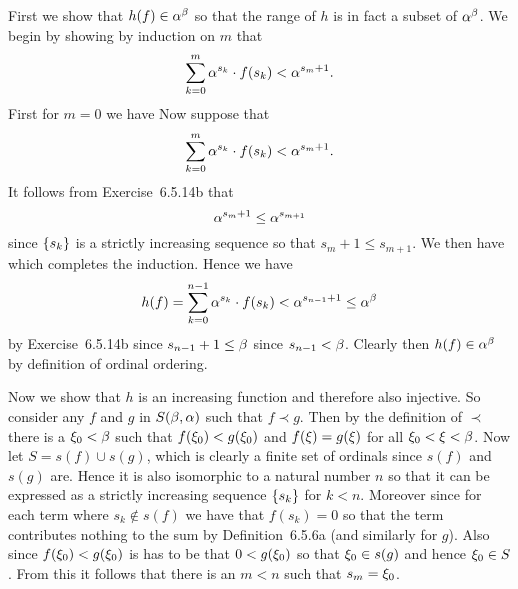 {{    First we show that $h(f) \in \alpha^\beta$ so that the range of $h$ is in fact a subset of $\alpha^\beta$.
    We begin by showing by induction on $m$ that
    $$
      \sum_{k=0}^m \alpha^{s_k} \cdot f(s_k) < \alpha^{s_m + 1} .
    $$
    First for $m=0$ we have
    Now suppose that
    $$
      \sum_{k=0}^m \alpha^{s_k} \cdot f(s_k) < \alpha^{s_m + 1}.
    $$
    It follows from Exercise~6.5.14b that
    $$
      \alpha^{s_m + 1} \leq \alpha^{s_{m+1}}
    $$
    since $\left\{ s_k \right\}$ is a strictly increasing sequence so that $s_m + 1 \leq s_{m+1}$.
    We then have
    which completes the induction.
    Hence we have
    $$
      h(f) = \sum_{k=0}^{n-1} \alpha^{s_k} \cdot f(s_k) < \alpha^{s_{n-1} + 1} \leq \alpha^\beta
    $$
    by Exercise~6.5.14b since $s_{n-1} + 1 \leq \beta$ since $s_{n-1} < \beta$.
    Clearly then $h(f) \in \alpha^\beta$ by definition of ordinal ordering.

    Now we show that $h$ is an increasing function and therefore also injective.
    So consider any $f$ and $g$ in $S(\beta, \alpha)$ such that $f \prec g$.
    Then by the definition of $\prec$ there is a $\xi_0 < \beta$ such that $f(\xi_0) < g(\xi_0)$ and $f(\xi) = g(\xi)$ for all $\xi_0 < \xi < \beta$.
    Now let $S = s(f) \cup  s(g)$, which is clearly a finite set of ordinals since $s(f)$ and $s(g)$ are.
    Hence it is also isomorphic to a natural number $n$ so that it can be expressed as a strictly increasing sequence $\left\{ s_k \right\}$ for $k < n$.
    Moreover
    since for each term where $s_k \notin s(f)$ we have that $f(s_k) = 0$ so that the term contributes nothing to the sum by Definition~6.5.6a (and similarly for $g$).
    Also since $f(\xi_0) < g(\xi_0)$ is has to be that $0 < g(\xi_0)$ so that $\xi_0 \in s(g)$ and hence $\xi_0 \in S$.
    From this it follows that there is an $m < n$ such that $s_m = \xi_0$.

}}
